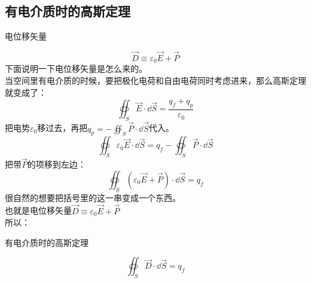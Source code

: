 \documentclass[cn,hazy,blue,14pt,normal]{elegantnote}
\numberwithin{equation}{section}
\begin{document}
\subsection{有电介质时的高斯定理}
\begin{definition}
	电位移矢量
\end{definition}
\begin{equation}\label{电位移矢量}
	\vec{D} \equiv \varepsilon_0\vec{E}+\vec{P}
\end{equation}
下面说明一下电位移矢量是怎么来的。\\
当空间里有电介质的时候，要把极化电荷和自由电荷同时考虑进来，那么高斯定理就变成了：
$$
\oiint_S \vec{E} \cdot \dd \vec{S} = \frac{q_f+q_p}{\varepsilon_0}
$$
把电势$\varepsilon_0$移过去，再把$q_p = - \oiint_S \vec{P}\cdot \dd \vec{S}$代入。
$$
\oiint_S \varepsilon_0 \vec{E} \cdot \dd \vec{S} = q_f - \oiint_S \vec{P}\cdot \dd \vec{S}
$$
把带$\vec{P}$的项移到左边：
$$
\oiint_S \left( \varepsilon_0 \vec{E} + \vec{P} \right)\cdot \dd \vec{S} = q_f
$$
很自然的想要把括号里的这一串变成一个东西。\\
也就是电位移矢量$\vec{D} \equiv \varepsilon_0\vec{E}+\vec{P}$\\
所以：
\begin{theorem}
	有电介质时的高斯定理
\end{theorem}
\begin{equation}\label{介质高斯定理}
	\oiint_S \vec{D} \cdot \dd \vec{S} = q_f
\end{equation}
\end{document}
